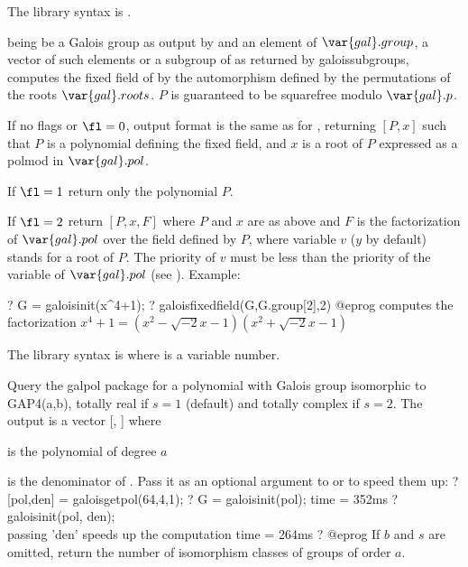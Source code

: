 The library syntax is .

\label{se:galoisfixedfield}
 being be a Galois group as output by  and
 an element of $\var{gal}.group$, a vector of such elements
or a subgroup of  as returned by galoissubgroups,
computes the fixed field of  by the automorphism defined by the
permutations  of the roots $\var{gal}.roots$. $P$ is guaranteed to
be squarefree modulo $\var{gal}.p$.

If no flags or $\fl=0$, output format is the same as for ,
returning $[P,x]$ such that $P$ is a polynomial defining the fixed field, and
$x$ is a root of $P$ expressed as a polmod in $\var{gal}.pol$.

If $\fl=1$ return only the polynomial $P$.

If $\fl=2$ return $[P,x,F]$ where $P$ and $x$ are as above and $F$ is the
factorization of $\var{gal}.pol$ over the field defined by $P$, where
variable $v$ ($y$ by default) stands for a root of $P$. The priority of $v$
must be less than the priority of the variable of $\var{gal}.pol$ (see
). Example:

\bprog
? G = galoisinit(x^4+1);
? galoisfixedfield(G,G.group[2],2)
@eprog\noindent
computes the factorization  $x^4+1=(x^2-\sqrt{-2}x-1)(x^2+\sqrt{-2}x-1)$

The library syntax is  where  is a variable number.

\label{se:galoisgetpol}
Query the galpol package for a polynomial with Galois group isomorphic to
GAP4(a,b), totally real if $s=1$ (default) and totally complex if $s=2$. The
output is a vector [, ] where

\item  {} is the polynomial of degree $a$

\item {} is the denominator of .
Pass it as an optional argument to  or  to
speed them up:
\bprog
? [pol,den] = galoisgetpol(64,4,1);
? G = galoisinit(pol);
time = 352ms
? galoisinit(pol, den);  \\ passing 'den' speeds up the computation
time = 264ms
? %
@eprog
If $b$ and $s$ are omitted, return the number of isomorphism classes of
groups of order $a$.

